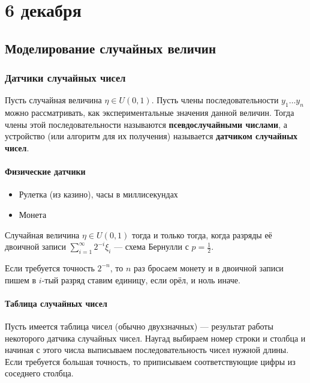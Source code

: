 \chapter{6 декабря}

\section{Моделирование случайных величин}

\subsection{Датчики случайных чисел}

\begin{definition}
    Пусть случайная величина \(\eta \in U(0, 1)\). Пусть члены последовательности \(y_1 \dots y_n\) можно рассматривать, как экспериментальные значения данной величин. Тогда члены этой последовательности называются \textbf{псевдослучайными числами}, а устройство (или алгоритм для их получения) называется \textbf{датчиком случайных чисел}.
\end{definition}

\subsubsection{Физические датчики}

\begin{itemize}
    \item Рулетка (из казино), часы в миллисекундах
    \item Монета
\end{itemize}

\begin{theorem}
    Случайная величина \(\eta \in U(0, 1)\) тогда и только тогда, когда разряды её двоичной записи \(\sum_{i=1}^{\infty} 2^{ - i} \xi_i\) --- схема Бернулли с \(p = \frac{1}{2}\).
\end{theorem}
\begin{corollary}
    Если требуется точность \(2^{-n}\), то \(n\) раз бросаем монету и в двоичной записи пишем в \(i\)-тый разряд ставим единицу, если орёл, и ноль иначе.
\end{corollary}

\subsubsection{Таблица случайных чисел}

Пусть имеется таблица чисел (обычно двухзначных) --- результат работы некоторого датчика случайных чисел. Наугад выбираем номер строки и столбца и начиная с этого числа выписываем последовательность чисел нужной длины. Если требуется большая точность, то приписываем соответствующие цифры из соседнего столбца.

